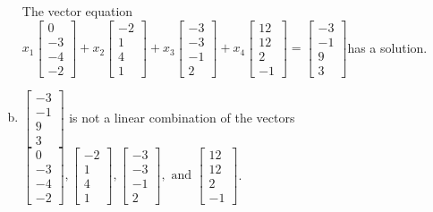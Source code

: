 \begin{exerciseAnswer}
\begin{enumerate}[(a)]
\begin{center}
\begin{minipage}{0.8\textwidth}
 The vector equation \( x_{1} \left[\begin{array}{c}
0 \\
-3 \\
-4 \\
-2
\end{array}\right] + x_{2} \left[\begin{array}{c}
-2 \\
1 \\
4 \\
1
\end{array}\right] + x_{3} \left[\begin{array}{c}
-3 \\
-3 \\
-1 \\
2
\end{array}\right] + x_{4} \left[\begin{array}{c}
12 \\
12 \\
2 \\
-1
\end{array}\right] = \left[\begin{array}{c}
-3 \\
-1 \\
9 \\
3
\end{array}\right] \)has a solution.
\end{minipage}\end{center}
    
\item 

\( \left[\begin{array}{c}
-3 \\
-1 \\
9 \\
3
\end{array}\right] \) is not a linear combination of the vectors \( \left[\begin{array}{c}
0 \\
-3 \\
-4 \\
-2
\end{array}\right] , \left[\begin{array}{c}
-2 \\
1 \\
4 \\
1
\end{array}\right] , \left[\begin{array}{c}
-3 \\
-3 \\
-1 \\
2
\end{array}\right] , \text{ and } \left[\begin{array}{c}
12 \\
12 \\
2 \\
-1
\end{array}\right] \). 


\end{enumerate}
    
\end{exerciseAnswer}
    
